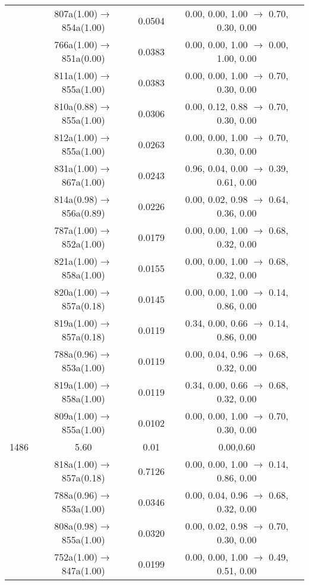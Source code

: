 \documentclass[10pt,a4paper]{article}
\begin{document}
\begin{longtable}{c|c|c|c}
 	& 807a(1.00)$\rightarrow$854a(1.00) &	 0.0504 &	 0.00, 0.00, 1.00 $\rightarrow$ 0.70, 0.30, 0.00 \\ 
 	& 766a(1.00)$\rightarrow$851a(0.00) &	 0.0383 &	 0.00, 0.00, 1.00 $\rightarrow$ 0.00, 1.00, 0.00 \\ 
 	& 811a(1.00)$\rightarrow$855a(1.00) &	 0.0383 &	 0.00, 0.00, 1.00 $\rightarrow$ 0.70, 0.30, 0.00 \\ 
 	& 810a(0.88)$\rightarrow$855a(1.00) &	 0.0306 &	 0.00, 0.12, 0.88 $\rightarrow$ 0.70, 0.30, 0.00 \\ 
 	& 812a(1.00)$\rightarrow$855a(1.00) &	 0.0263 &	 0.00, 0.00, 1.00 $\rightarrow$ 0.70, 0.30, 0.00 \\ 
 	& 831a(1.00)$\rightarrow$867a(1.00) &	 0.0243 &	 0.96, 0.04, 0.00 $\rightarrow$ 0.39, 0.61, 0.00 \\ 
 	& 814a(0.98)$\rightarrow$856a(0.89) &	 0.0226 &	 0.00, 0.02, 0.98 $\rightarrow$ 0.64, 0.36, 0.00 \\ 
 	& 787a(1.00)$\rightarrow$852a(1.00) &	 0.0179 &	 0.00, 0.00, 1.00 $\rightarrow$ 0.68, 0.32, 0.00 \\ 
 	& 821a(1.00)$\rightarrow$858a(1.00) &	 0.0155 &	 0.00, 0.00, 1.00 $\rightarrow$ 0.68, 0.32, 0.00 \\ 
 	& 820a(1.00)$\rightarrow$857a(0.18) &	 0.0145 &	 0.00, 0.00, 1.00 $\rightarrow$ 0.14, 0.86, 0.00 \\ 
 	& 819a(1.00)$\rightarrow$857a(0.18) &	 0.0119 &	 0.34, 0.00, 0.66 $\rightarrow$ 0.14, 0.86, 0.00 \\ 
 	& 788a(0.96)$\rightarrow$853a(1.00) &	 0.0119 &	 0.00, 0.04, 0.96 $\rightarrow$ 0.68, 0.32, 0.00 \\ 
 	& 819a(1.00)$\rightarrow$858a(1.00) &	 0.0119 &	 0.34, 0.00, 0.66 $\rightarrow$ 0.68, 0.32, 0.00 \\ 
 	& 809a(1.00)$\rightarrow$855a(1.00) &	 0.0102 &	 0.00, 0.00, 1.00 $\rightarrow$ 0.70, 0.30, 0.00 \\ 
 \hline1486 &	 5.60 &	 0.01 &	 0.00,0.60 \\ 
  	& 818a(1.00)$\rightarrow$857a(0.18) &	 0.7126 &	 0.00, 0.00, 1.00 $\rightarrow$ 0.14, 0.86, 0.00 \\ 
 	& 788a(0.96)$\rightarrow$853a(1.00) &	 0.0346 &	 0.00, 0.04, 0.96 $\rightarrow$ 0.68, 0.32, 0.00 \\ 
 	& 808a(0.98)$\rightarrow$855a(1.00) &	 0.0320 &	 0.00, 0.02, 0.98 $\rightarrow$ 0.70, 0.30, 0.00 \\ 
 	& 752a(1.00)$\rightarrow$847a(1.00) &	 0.0199 &	 0.00, 0.00, 1.00 $\rightarrow$ 0.49, 0.51, 0.00 \\ 

\end{longtable}
\end{document}
